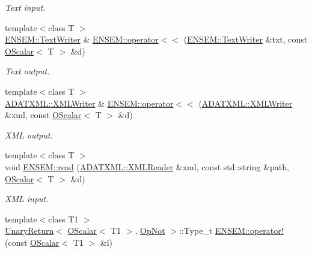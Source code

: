 \begin{DoxyCompactItemize}
\begin{DoxyCompactList}\small\item\em Text input. \end{DoxyCompactList}\item 
{\footnotesize template$<$class T $>$ }\\\mbox{\hyperlink{classENSEM_1_1TextWriter}{E\+N\+S\+E\+M\+::\+Text\+Writer}} \& \mbox{\hyperlink{group__obsscalar_gaa7ba73cd5fa56a8fc62b9f9297fbef31}{E\+N\+S\+E\+M\+::operator$<$$<$}} (\mbox{\hyperlink{classENSEM_1_1TextWriter}{E\+N\+S\+E\+M\+::\+Text\+Writer}} \&txt, const \mbox{\hyperlink{classENSEM_1_1OScalar}{O\+Scalar}}$<$ T $>$ \&d)
\begin{DoxyCompactList}\small\item\em Text output. \end{DoxyCompactList}\item 
{\footnotesize template$<$class T $>$ }\\\mbox{\hyperlink{classADATXML_1_1XMLWriter}{A\+D\+A\+T\+X\+M\+L\+::\+X\+M\+L\+Writer}} \& \mbox{\hyperlink{group__obsscalar_ga2eb6bed5bd0b7f67a0a0641033b3a120}{E\+N\+S\+E\+M\+::operator$<$$<$}} (\mbox{\hyperlink{classADATXML_1_1XMLWriter}{A\+D\+A\+T\+X\+M\+L\+::\+X\+M\+L\+Writer}} \&xml, const \mbox{\hyperlink{classENSEM_1_1OScalar}{O\+Scalar}}$<$ T $>$ \&d)
\begin{DoxyCompactList}\small\item\em X\+ML output. \end{DoxyCompactList}\item 
{\footnotesize template$<$class T $>$ }\\void \mbox{\hyperlink{group__obsscalar_ga8844f89649f50b51ab6ae9f43064458c}{E\+N\+S\+E\+M\+::read}} (\mbox{\hyperlink{classADATXML_1_1XMLReader}{A\+D\+A\+T\+X\+M\+L\+::\+X\+M\+L\+Reader}} \&xml, const std\+::string \&path, \mbox{\hyperlink{classENSEM_1_1OScalar}{O\+Scalar}}$<$ T $>$ \&d)
\begin{DoxyCompactList}\small\item\em X\+ML input. \end{DoxyCompactList}\item 
{\footnotesize template$<$class T1 $>$ }\\\mbox{\hyperlink{structENSEM_1_1UnaryReturn}{Unary\+Return}}$<$ \mbox{\hyperlink{classENSEM_1_1OScalar}{O\+Scalar}}$<$ T1 $>$, \mbox{\hyperlink{structENSEM_1_1OpNot}{Op\+Not}} $>$\+::Type\+\_\+t \mbox{\hyperlink{group__obsscalar_gaa78e8f77d7f0b9803c015de6cc93c228}{E\+N\+S\+E\+M\+::operator!}} (const \mbox{\hyperlink{classENSEM_1_1OScalar}{O\+Scalar}}$<$ T1 $>$ \&l)

\end{DoxyCompactItemize}
